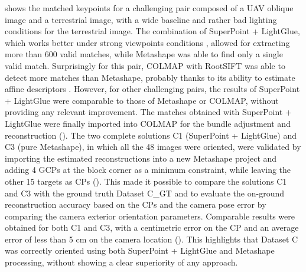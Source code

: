  shows the matched keypoints for a challenging pair composed of a UAV oblique image and a terrestrial image, with a wide baseline and rather bad lighting conditions for the terrestrial image. 
The combination of SuperPoint + LightGlue, which works better under strong viewpoints conditions \citep{ioli2024deep}, allowed for extracting more than 600 valid matches, while Metashape was able to find only a single valid match. Surprisingly for this pair, COLMAP with RootSIFT was able to detect more matches than Metashape, probably thanks to its ability to estimate affine descriptors \cite{Lindeberg1997_affine}. 
However, for other challenging pairs, the results of SuperPoint + LightGlue were comparable to those of Metashape or COLMAP, without providing any relevant improvement. The matches obtained with SuperPoint + LightGlue were finally imported into COLMAP for the bundle adjustment and reconstruction ().
The two complete solutions C1 (SuperPoint + LightGlue) and C3 (pure Metashape), in which all the 48 images were oriented, were validated by importing the estimated reconstructions into a new Metashape project and adding 4 GCPs at the block corner as a minimum constraint, while leaving the other 15 targets as CPs (). 
This made it possible to compare the solutions C1 and C3 with the ground truth Dataset C\_GT and to evaluate the on-ground reconstruction accuracy based on the CPs and the camera pose error by comparing the camera exterior orientation parameters.
Comparable results were obtained for both C1 and C3, with a centimetric error on the CP and an average error of less than 5 cm on the camera location (). 
This highlights that Dataset C was correctly oriented using both SuperPoint + LightGlue and Metashape processing, without showing a clear superiority of any approach. 


